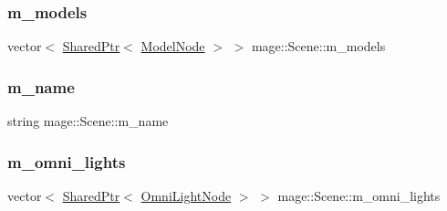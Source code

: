 \hypertarget{classmage_1_1_scene_a01132a667fbc1517f11ae561bc221071}{}\label{classmage_1_1_scene_a01132a667fbc1517f11ae561bc221071} 
\subsubsection{\texorpdfstring{m\+\_\+models}{m\_models}}
{\footnotesize\ttfamily vector$<$ \hyperlink{namespacemage_a1e01ae66713838a7a67d30e44c67703e}{Shared\+Ptr}$<$ \hyperlink{classmage_1_1_model_node}{Model\+Node} $>$ $>$ mage\+::\+Scene\+::m\+\_\+models\hspace{0.3cm}{\ttfamily [private]}}

\hypertarget{classmage_1_1_scene_a6cc8cb08b1853c4e3063b33a94e8fb47}{}\label{classmage_1_1_scene_a6cc8cb08b1853c4e3063b33a94e8fb47} 
\subsubsection{\texorpdfstring{m\+\_\+name}{m\_name}}
{\footnotesize\ttfamily string mage\+::\+Scene\+::m\+\_\+name\hspace{0.3cm}{\ttfamily [private]}}

\hypertarget{classmage_1_1_scene_a881c3dd7e85e5069650f29fd2722bf78}{}\label{classmage_1_1_scene_a881c3dd7e85e5069650f29fd2722bf78} 
\subsubsection{\texorpdfstring{m\+\_\+omni\+\_\+lights}{m\_omni\_lights}}
{\footnotesize\ttfamily vector$<$ \hyperlink{namespacemage_a1e01ae66713838a7a67d30e44c67703e}{Shared\+Ptr}$<$ \hyperlink{namespacemage_a85082c7e15a2bbf19b1753b7de6c45db}{Omni\+Light\+Node} $>$ $>$ mage\+::\+Scene\+::m\+\_\+omni\+\_\+lights\hspace{0.3cm}{\ttfamily [private]}}

\hypertarget{classmage_1_1_scene_a274ed5e548431ba805513a86a00bbaf1}{}\label{classmage_1_1_scene_a274ed5e548431ba805513a86a00bbaf1} 
